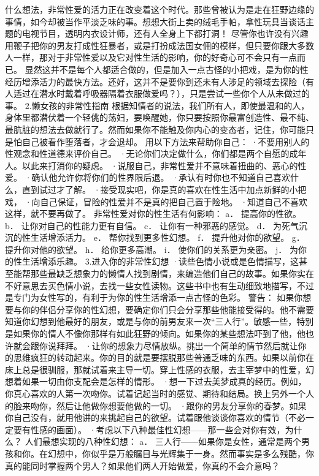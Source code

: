 \documentclass[12pt,UTF8]{ctexbook}
\begin{document}
什么想法，非常性爱的活力正在改变着这个时代。那些曾被认为是走在狂野边缘的事情，如今却被当作平淡乏味的事。想想大街上卖的绒毛手帕，拿性玩具当谈话主题的电视节目，透明内衣设计师，还有人全身上下都打洞！
尽管你也许没有兴趣用鞭子把你的男友打成性狂暴者，或是打扮成法国女佣的模样，但只要你跟大多数人一样，那对于非常性爱以及它对性生活的影响，你的好奇心可不会只有一点而已。
显然这并不是每个人都适合做的，但是加入一点古怪的小把戏，是为你的性经历增添活力的最快方法。还好，这并不是要你到还未有人涉足的领域去探险（有人适过在潜水时戴着呼吸器隔着衣服做爱吗？），只是尝试一些你个人从未做过的事。
2.懒女孩的非常性指南
根据知情者的说法，我们所有人，即使最温和的人，身体里都潜伏着一个轻佻的荡妇，要唤醒她，你只要按照你最富创造性、最不纯、最肮脏的想法去做就行了。然而如果你不能触及你内心的变态者，记住，你可能只是怕自己被看作堕落者，才会退却。
用以下方法来帮助你自己：
·不要用别人的性观念和性道德来评价自己。
·无论你们决定做什么，你们都是两个自愿的成年人。以此来打消你的疑虑。
·说服自己，非常性爱并不意味着扭曲的、恶心的性爱。
·确认他允许你将你们的性界限后退。
·承认有时你也不知道自己喜欢什么，直到试过才了解。
·接受现实吧，你是真的喜欢在性生活中加点新鲜的小把戏，
·向自己保证，冒险的性爱并不是真的把自己置于险地。
·知道自己不喜欢这样，就不要再做了。
非常性爱对你的性生活有何影响：
a． 提高你的性欲。
b． 让你对自己的性能力更有自信。
c． 让你有一种邪恶的感觉。
d． 为死气沉沉的性生活增添活力。
e． 帮你找到更多性幻想。
f． 提升他对你的欲望。
g． 提升你对他的欲望。
h． 给你更多高潮。
i． 使你们的关系更为亲密。
j． 为你的性生活增添乐趣。
3.进入你的非常性幻想
·读些色情小说或是色情描写，这甚至能帮那些最缺乏想象力的懒情人找到剧情，来编造他们自己的故事。如果你实在不好意思去买色情小说，去找一些女性读物。这些书中也有生动细致地描写，不过是专门为女性写的，有利于为你的性生活增添一点古怪的色彩。
警告：
如果你想要与你的伴侣分享你的性幻想，要确定你们只会分享那些他能接受得的。他不需要知道你幻想到他最好的朋友，或是与你的前男友来一次“三人行”。敏感一些，特别是如果你的情人不像你那样有如此狂野的倾向。如果你的某些想法吓到了他，他也许就会跟你说拜拜。
·让你的想象力尽情放纵。挑出一个简单的情节然后就让你的思维疯狂的转动起来。你的目的就是要摆脱那些普通乏味的东西。如果以前你在床上总是很驯服，那就试着来主导一切。穿上性感的衣服，去主宰梦中的性爱，幻想着如果一切由你支配会是怎样的情形。
·想一下过去美梦成真的经历。例如，你真心喜欢的人第一次吻你。试着记起当时的感觉、期待和结局。换上另外一个人的脸来吻你，然后让他做你想要他做的一切。
·跟你的男友分享你的春梦。如果你自己没有，就用他讲的来挑起自己的欲望。试着跟他谈谈你喜欢的情节（不必一定要有性感的画面）。
·考虑以下八种最佳性幻想——那一些会对你有效，为什么？
人们最想实现的八种性幻想：
a． 三人行——如果你是女性，通常是两个男孩和你。在幻想中，你似乎是万般瞩目与光辉集于一身。然而事实是多么残酷，你真的能同时掌握两个男人？如果他们两人开始做爱，你真的不会介意吗？
\end{document}
